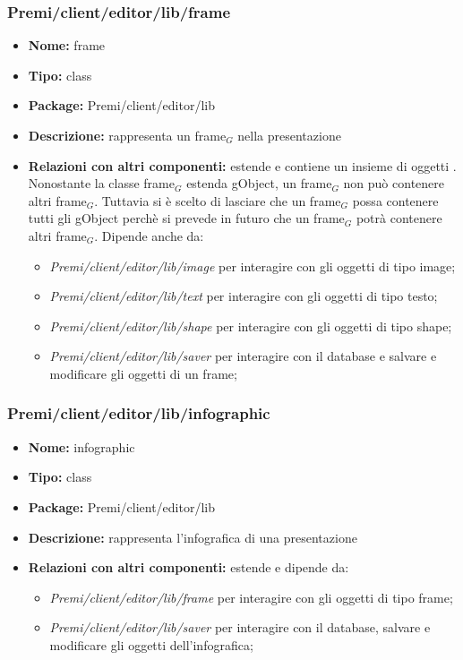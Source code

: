 \subsubsection{Premi/client/editor/lib/frame}
\begin{itemize}
  \item[] \textbf{Nome:} frame
  \item[] \textbf{Tipo:} class
  \item[] \textbf{Package:} Premi/client/editor/lib
  \item[] \textbf{Descrizione:} rappresenta un frame$_G$ nella presentazione
  \item[] \textbf{Relazioni con altri componenti:} estende  e contiene un insieme di oggetti . Nonostante la classe frame$_G$ estenda gObject, un frame$_G$ non può contenere altri frame$_G$. Tuttavia si è scelto di lasciare che un frame$_G$ possa contenere tutti gli gObject perchè si prevede in futuro che un frame$_G$ potrà contenere altri frame$_G$. Dipende anche da: 
\begin{itemize} 
	\item \textit{Premi/client/editor/lib/image} per interagire con gli oggetti di tipo image;
	\item \textit{Premi/client/editor/lib/text} per interagire con gli oggetti di tipo testo;
	\item \textit{Premi/client/editor/lib/shape} per interagire con gli oggetti di tipo shape;
	\item \textit{Premi/client/editor/lib/saver} per interagire con il database e salvare e modificare gli oggetti di un frame;
\end{itemize}  
\end{itemize}
\subsubsection{Premi/client/editor/lib/infographic}
\begin{itemize}
  \item[] \textbf{Nome:} infographic
  \item[] \textbf{Tipo:} class
  \item[] \textbf{Package:} Premi/client/editor/lib
  \item[] \textbf{Descrizione:} rappresenta l'infografica di una presentazione
  \item[] \textbf{Relazioni con altri componenti:} estende  e dipende da:
\begin{itemize} 
	\item \textit{Premi/client/editor/lib/frame} per interagire con gli oggetti di tipo frame;
	\item \textit{Premi/client/editor/lib/saver} per interagire con il database, salvare e modificare gli oggetti dell'infografica;
\end{itemize}  
\end{itemize}
